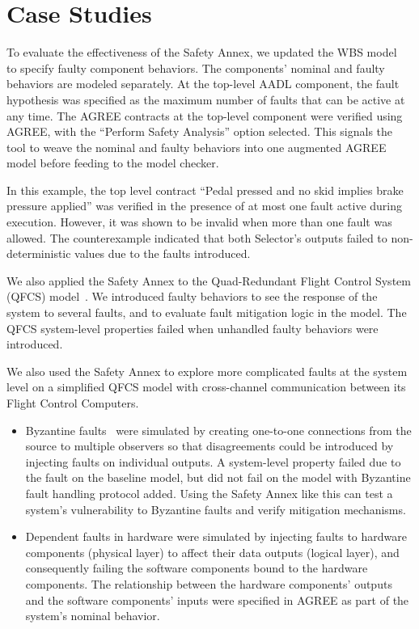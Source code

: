 \section{Case Studies}
\label{sec:case_study}

To evaluate the effectiveness of the Safety Annex, we updated the WBS model~\cite{Stewart17:IMBSA} to specify faulty component behaviors. The components' nominal  and faulty behaviors are modeled separately. At the top-level AADL component, the fault hypothesis was specified as the maximum number of faults that can be active at any time. The AGREE contracts at the top-level component were verified using AGREE, with the ``Perform Safety Analysis'' option selected. This signals the tool to weave the nominal and faulty behaviors into one augmented AGREE model before feeding to the model checker.

In this example, the top level contract ``Pedal pressed and no skid implies brake pressure applied'' was verified in the presence of at most one fault active during execution.  However, it was shown to be invalid when more than one fault was allowed. The counterexample indicated that both Selector's outputs failed to non-deterministic values due to the faults introduced.

We also applied the Safety Annex to the Quad-Redundant Flight Control System (QFCS) model~\cite{QFCS15:backes}.  We introduced faulty behaviors to see the response of the system to several faults, and to evaluate fault mitigation logic in the model.  The QFCS system-level properties failed when unhandled faulty behaviors were introduced.

We also used the Safety Annex to explore more complicated faults at the system level on a simplified QFCS model with cross-channel communication between its Flight Control Computers.

\begin{itemize} 
	\item Byzantine faults~\cite{Driscoll-Byzantine-Fault} were simulated by creating one-to-one connections from the source to multiple observers so that disagreements could be introduced by injecting faults on individual outputs. A system-level property failed due to the fault on the baseline model, but did not fail on the model with Byzantine fault handling protocol added. Using the Safety Annex like this can test a system's vulnerability to Byzantine faults and verify mitigation mechanisms.
	
	\item Dependent faults in hardware were simulated by injecting faults to hardware components (physical layer) to affect their data outputs (logical layer), and consequently failing the software components bound to the hardware components. The relationship between the hardware components' outputs and the software components' inputs were specified in AGREE as part of the system's nominal behavior.	
\end{itemize}


